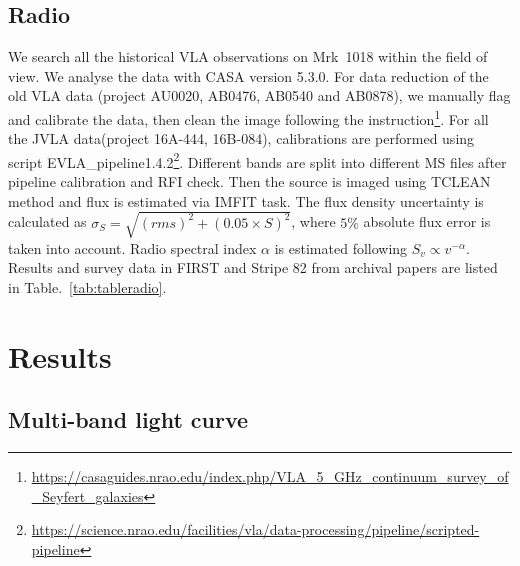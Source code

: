 \documentclass[twocolumn]{aastex63}
\begin{document}
\subsection{Radio}
We search all the historical VLA observations on Mrk~1018 within the field of view. We analyse the data with CASA version 5.3.0\citep{2007ASPC..376..127M}. For data reduction of the old VLA data (project AU0020, AB0476, AB0540 and AB0878), we manually flag and calibrate the data, then clean the image following the instruction\footnote{\url{https://casaguides.nrao.edu/index.php/VLA_5_GHz_continuum_survey_of_Seyfert_galaxies}}. For all the JVLA data(project 16A-444, 16B-084), calibrations are performed using script EVLA\_pipeline1.4.2\footnote{\url{https://science.nrao.edu/facilities/vla/data-processing/pipeline/scripted-pipeline}}. Different bands are split into different MS files after pipeline calibration and RFI check. Then the source is imaged using TCLEAN method and flux is estimated via IMFIT task. The flux density uncertainty is calculated as $\sigma_{S}=\sqrt{(rms)^2+(0.05\times S)^2}$, where $5\%$ absolute flux error is taken into account. Radio spectral index $\alpha$ is estimated following $S_v \propto v^{-\alpha}$. Results and survey data in FIRST\citep{1994ASPC...61..165B,1995ApJ...450..559B} and Stripe 82\citep{2011AJ....142....3H} from archival papers are listed in Table.~\ref{tab:tableradio}.

\section{Results}
\label{sec:result}

\subsection{Multi-band light curve}
\end{document}

